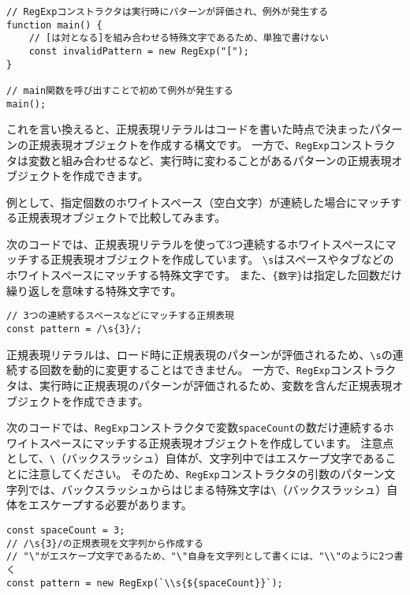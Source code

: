 \begin{lstlisting}
// RegExpコンストラクタは実行時にパターンが評価され、例外が発生する
function main() {
    // [は対となる]を組み合わせる特殊文字であるため、単独で書けない
    const invalidPattern = new RegExp("[");
}

// main関数を呼び出すことで初めて例外が発生する
main();
\end{lstlisting}

これを言い換えると、正規表現リテラルはコードを書いた時点で決まったパターンの正規表現オブジェクトを作成する構文です。
一方で、\texttt{RegExp}コンストラクタは変数と組み合わせるなど、実行時に変わることがあるパターンの正規表現オブジェクトを作成できます。

例として、指定個数のホワイトスペース（空白文字）が連続した場合にマッチする正規表現オブジェクトで比較してみます。

次のコードでは、正規表現リテラルを使って3つ連続するホワイトスペースにマッチする正規表現オブジェクトを作成しています。
\texttt{\textbackslash s}はスペースやタブなどのホワイトスペースにマッチする特殊文字です。
また、\texttt{\{数字\}}は指定した回数だけ繰り返しを意味する特殊文字です。

\begin{lstlisting}
// 3つの連続するスペースなどにマッチする正規表現
const pattern = /\s{3}/;
\end{lstlisting}

正規表現リテラルは、ロード時に正規表現のパターンが評価されるため、\texttt{\textbackslash s}の連続する回数を動的に変更することはできません。
一方で、\texttt{RegExp}コンストラクタは、実行時に正規表現のパターンが評価されるため、変数を含んだ正規表現オブジェクトを作成できます。

次のコードでは、\texttt{RegExp}コンストラクタで変数\texttt{spaceCount}の数だけ連続するホワイトスペースにマッチする正規表現オブジェクトを作成しています。
注意点として、\texttt{\textbackslash}（バックスラッシュ）自体が、文字列中ではエスケープ文字であることに注意してください。
そのため、\texttt{RegExp}コンストラクタの引数のパターン文字列では、バックスラッシュからはじまる特殊文字は\texttt{\textbackslash}（バックスラッシュ）自体をエスケープする必要があります。

\begin{lstlisting}
const spaceCount = 3;
// /\s{3}/の正規表現を文字列から作成する
// "\"がエスケープ文字であるため、"\"自身を文字列として書くには、"\\"のように2つ書く
const pattern = new RegExp(`\\s{${spaceCount}}`);
\end{lstlisting}

